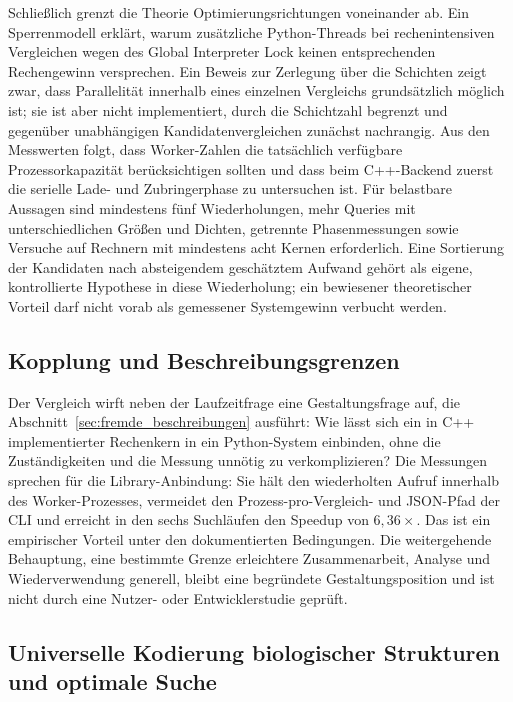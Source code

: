 \documentclass[a4paper,12pt, twoside]{report}
\theoremstyle{definition}
\begin{document}
Schließlich grenzt die Theorie Optimierungsrichtungen voneinander ab. Ein Sperrenmodell erklärt, warum zusätzliche Python-Threads bei rechenintensiven Vergleichen wegen des Global Interpreter Lock keinen entsprechenden Rechengewinn versprechen. Ein Beweis zur Zerlegung über die Schichten zeigt zwar, dass Parallelität innerhalb eines einzelnen Vergleichs grundsätzlich möglich ist; sie ist aber nicht implementiert, durch die Schichtzahl begrenzt und gegenüber unabhängigen Kandidatenvergleichen zunächst nachrangig. Aus den Messwerten folgt, dass Worker-Zahlen die tatsächlich verfügbare Prozessorkapazität berücksichtigen sollten und dass beim C++-Backend zuerst die serielle Lade- und Zubringerphase zu untersuchen ist. Für belastbare Aussagen sind mindestens fünf Wiederholungen, mehr Queries mit unterschiedlichen Größen und Dichten, getrennte Phasenmessungen sowie Versuche auf Rechnern mit mindestens acht Kernen erforderlich. Eine Sortierung der Kandidaten nach absteigendem geschätztem Aufwand gehört als eigene, kontrollierte Hypothese in diese Wiederholung; ein bewiesener theoretischer Vorteil darf nicht vorab als gemessener Systemgewinn verbucht werden.

\subsection{Kopplung und Beschreibungsgrenzen}
\label{sec:zus_kopplung}

Der Vergleich wirft neben der Laufzeitfrage eine Gestaltungsfrage auf, die Abschnitt~\ref{sec:fremde_beschreibungen} ausführt: Wie lässt sich ein in C++ implementierter Rechenkern in ein Python-System einbinden, ohne die Zuständigkeiten und die Messung unnötig zu verkomplizieren? Die Messungen sprechen für die Library-Anbindung: Sie hält den wiederholten Aufruf innerhalb des Worker-Prozesses, vermeidet den Prozess-pro-Vergleich- und JSON-Pfad der CLI und erreicht in den sechs Suchläufen den Speedup von $6{,}36\times$. Das ist ein empirischer Vorteil unter den dokumentierten Bedingungen. Die weitergehende Behauptung, eine bestimmte Grenze erleichtere Zusammenarbeit, Analyse und Wiederverwendung generell, bleibt eine begründete Gestaltungsposition und ist nicht durch eine Nutzer- oder Entwicklerstudie geprüft.

\subsection{Universelle Kodierung biologischer Strukturen und optimale Suche}
\label{sec:zus_universell}
\end{document}
